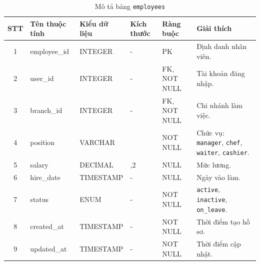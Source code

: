 \documentclass[../DoAn.tex]{subfiles}
\begin{document}
\begin{table}[H]
\centering
\renewcommand{\arraystretch}{1.3}
\small
\begin{tabularx}{\textwidth}{|c|>{\RaggedRight\arraybackslash}p{2.9cm}|>{\Centering\arraybackslash}p{2.2cm}|>{\Centering\arraybackslash}p{1.3cm}|>{\Centering\arraybackslash}p{2.2cm}|>{\RaggedRight\arraybackslash}X|}
\hline
\textbf{STT} & \textbf{Tên thuộc tính} & \textbf{Kiểu dữ liệu} & \textbf{Kích thước} & \textbf{Ràng buộc} & \textbf{Giải thích} \\
\hline
1 & employee\_id & INTEGER & - & PK & Định danh nhân viên. \\ \hline
2 & user\_id & INTEGER & - & FK, NOT NULL & Tài khoản đăng nhập. \\ \hline
3 & branch\_id & INTEGER & - & FK, NOT NULL & Chi nhánh làm việc. \\ \hline
4 & position & VARCHAR & 20 & NOT NULL & Chức vụ: \texttt{manager}, \texttt{chef}, \texttt{waiter}, \texttt{cashier}. \\ \hline
5 & salary & DECIMAL & 10,2 & NULL & Mức lương. \\ \hline
6 & hire\_date & TIMESTAMP & - & NULL & Ngày vào làm. \\ \hline
7 & status & ENUM & - & NOT NULL & \texttt{active}, \texttt{inactive}, \texttt{on\_leave}. \\ \hline
8 & created\_at & TIMESTAMP & - & NOT NULL & Thời điểm tạo hồ sơ. \\ \hline
9 & updated\_at & TIMESTAMP & - & NOT NULL & Thời điểm cập nhật. \\ \hline
\end{tabularx}
\caption{Mô tả bảng \texttt{employees}}
\end{table}
\end{document}

